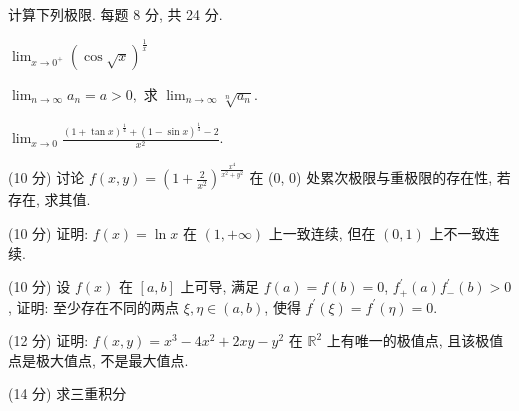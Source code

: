 \par{}
计算下列极限. 每题 8 分, 共 24 分.\par
$\lim_{x\to0^{+}}(\cos\sqrt{x})^{\frac{1}{x}}$\par
$\lim_{n\to \infty}a_n = a > 0,$ 求 $\lim_{n\to \infty}\sqrt[n]{a_n}$.\par
$\lim_{x\to 0}\frac{(1 + \tan x)^{\frac{1}{4}} + (1 - \sin x)^{\frac{1}{4}} - 2}{x^2}.$\par
\par{}
(10 分) 讨论 $f(x, y) = \left(1 + \frac{2}{x^2}\right)^{\frac{x^4}{x^2 + y^2}}$ 在 (0, 0) 处累次极限与重极限的存在性, 若存在, 求其值.\par
\par{}
(10 分) 证明: $f(x) = \ln x$ 在 $(1, +\infty)$ 上一致连续, 但在 $(0, 1)$ 上不一致连续.\par
\par{}
(10 分) 设 $f(x)$ 在 $[a, b]$ 上可导, 满足 $f(a) = f(b) = 0$, $f_{+}^{\prime}(a)f_{-}^{\prime}(b) > 0$, 证明: 至少存在不同的两点 $\xi, \eta \in (a, b)$, 使得 $f^{\prime}(\xi) = f^{\prime}(\eta) = 0$.\par
\par{}
(12 分) 证明: $f(x, y) = x^3 - 4x^2 + 2xy - y^2$ 在 $\mathbb{R}^2$ 上有唯一的极值点, 且该极值点是极大值点, 不是最大值点.\par
\par{}
\par{}
(14 分) 求三重积分\par
\nopagebreak[4]
